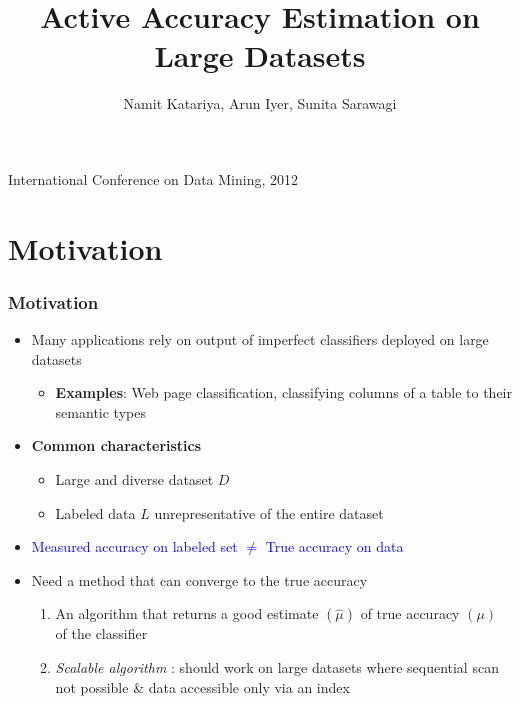 \documentclass[usenames,dvipsnames, 11pt]{beamer}
\title[{\makebox[.45\paperwidth]{Active Evaluation of Classifiers\hfill%
       \insertframenumber/\inserttotalframenumber}}]{Active Accuracy Estimation on Large Datasets}
\author {Namit Katariya, Arun Iyer, Sunita Sarawagi}
\institute{IIT Bombay}
\newlength{\wideitemsep}
\let\olditem\item
\renewcommand{\item}{\setlength{\itemsep}{\wideitemsep}\olditem}
\begin{document}
\begin{frame}
\titlepage
\begin{center}
\large{International Conference on Data Mining, 2012} \\ \vspace*{10pt}
\end{center}
\end{frame}




\section{Motivation}
\begin{frame}
\frametitle{Motivation}
\pause
\begin{itemize}
\item Many applications rely on output of imperfect classifiers deployed on large datasets \\ 
\begin{itemize}
\item[] \textbf{Examples}: Web page classification, classifying columns of a table to their semantic types
\end{itemize}
\pause
\item \textbf{Common characteristics} 
\begin{itemize}
\item Large and diverse dataset $D$
\item Labeled data $L$ unrepresentative of the entire dataset
\end{itemize}
\pause
\item \textcolor{blue}{Measured accuracy on labeled set $\neq$ True accuracy on data}
\pause
\item Need a method that can converge to the true accuracy
\begin{enumerate}
\item An algorithm that returns a good estimate $(\hat{\mu})$ of true accuracy $(\mu)$ of the classifier
\item \textit{Scalable algorithm} : should work on large datasets where sequential scan not possible \& data accessible only via an index
\end{enumerate} 
\end{itemize}
\end{frame}
\end{document}
